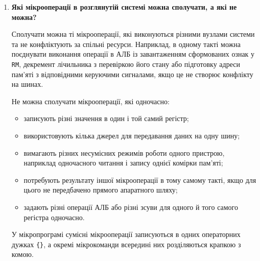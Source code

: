 \documentclass[12pt,a4paper]{article}
\begin{document}
\begin{enumerate}
        \textbf{Мікропрограма} --- це послідовність мікрокоманд, виконання яких реалізує певну машинну команду або заданий алгоритм обробки даних.

        \textbf{Мікроалгоритм} --- це алгоритмічний опис послідовності мікрооперацій, перевірок умов і переходів. На його основі складається мікропрограма.

        \item \textbf{Які мікрооперації в розглянутій системі можна сполучати, а які не можна?}

        Сполучати можна ті мікрооперації, які виконуються різними вузлами системи та не конфліктують за спільні ресурси. Наприклад, в одному такті можна поєднувати виконання операції в АЛБ із завантаженням сформованих ознак у \texttt{RM}, декремент лічильника з перевіркою його стану або підготовку адреси пам'яті з відповідними керуючими сигналами, якщо це не створює конфлікту на шинах.

        Не можна сполучати мікрооперації, які одночасно:
        \begin{itemize}
            \item записують різні значення в один і той самий регістр;
            \item використовують кілька джерел для передавання даних на одну шину;
            \item вимагають різних несумісних режимів роботи одного пристрою, наприклад одночасного читання і запису однієї комірки пам'яті;
            \item потребують результату іншої мікрооперації в тому самому такті, якщо для цього не передбачено прямого апаратного шляху;
            \item задають різні операції АЛБ або різні зсуви для одного й того самого регістра одночасно.
        \end{itemize}

        У мікропрограмі сумісні мікрооперації записуються в одних операторних дужках \texttt{\{\}}, а окремі мікрокоманди всередині них розділяються крапкою з комою.
    \end{enumerate}
\end{document}
